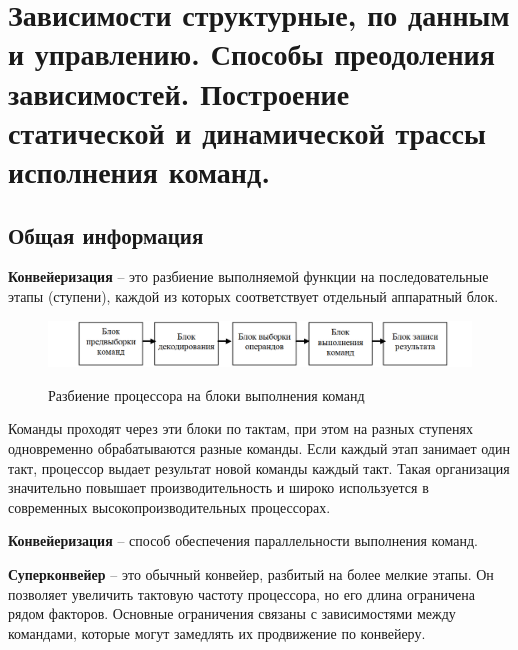 


	
	\tableofcontents
	\newpage
	
	\section{Зависимости структурные, по данным и управлению. Способы преодоления зависимостей. Построение статической и динамической трассы исполнения команд.}
	\vspace{-1em}
	\subsection{Общая информация}
	\vspace{-0.5em}
	\textbf{Конвейеризация} -- это разбиение выполняемой функции на последовательные этапы (ступени), каждой из которых соответствует отдельный аппаратный блок.
	
	\vspace{-1em}
	\begin{figure}[H]
		\centering
		\includegraphics[width=1\linewidth, height=0.075\textheight]{img/01_01}
		\par
		{\small Разбиение процессора на блоки выполнения команд}
		\label{fig:01_01}
	\end{figure}
	\vspace{-1em}
	
	Команды проходят через эти блоки по тактам, при этом на разных ступенях одновременно обрабатываются разные команды. Если каждый этап занимает один такт, процессор выдает результат новой команды каждый такт. Такая организация значительно повышает производительность и широко используется в современных высокопроизводительных процессорах.
	\par\vspace{0.5em}
	\textbf{Конвейеризация} -- способ обеспечения параллельности выполнения команд.
	
	\textbf{Суперконвейер} -- это обычный конвейер, разбитый на более мелкие этапы. Он позволяет увеличить тактовую частоту процессора, но его длина ограничена рядом факторов. Основные ограничения связаны с зависимостями между командами, которые могут замедлять их продвижение по конвейеру.
	
	\par\vspace{0.5em}
	
